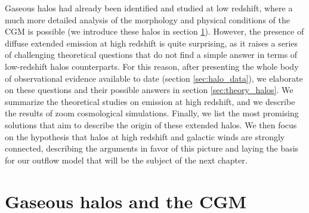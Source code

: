 Gaseous halos had already been identified and studied at low redshift, where a much more detailed analysis of the morphology and physical conditions of the CGM is possible (we introduce these halos in section \ref{sec:general_halos}). However, the presence of diffuse extended \CII emission at high redshift is quite surprising, as it raises a series of challenging theoretical questions that do not find a simple answer in terms of low-redshift halos counterparts. For this reason, after presenting the whole body of observational evidence available to date (section \ref{sec:halo_data}), we elaborate on these questions and their possible answers in section \ref{sec:theory_halos}. We summarize the theoretical studies on \CII emission at high redshift, and we describe the results of zoom cosmological simulations. Finally, we list the most promising solutions that aim to describe the origin of these extended halos. We then focus on the hypothesis that halos at high redshift and galactic winds are strongly connected, describing the arguments in favor of this picture and laying the basis for our outflow model that will be the subject of the next chapter. 





\section{Gaseous halos and the CGM} \label{sec:general_halos}


